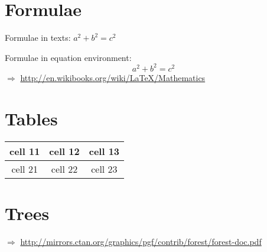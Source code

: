 \section{Formulae}

Formulae in texts: $a^2 + b^2 = c^2$

\noindent Formulae in equation environment:
\begin{equation}
a^2 + b^2 = c^2
\end{equation}
$\Rightarrow$ \url{http://en.wikibooks.org/wiki/LaTeX/Mathematics}

\section{Tables}

\begin{tabular}{c|c|c}
\hline
cell 11 & cell 12 & cell 13 \\
\hline
cell 21 & cell 22 & cell 23 \\
\hline
\end{tabular}

\section{Trees}




\noindent $\Rightarrow$ \url{http://mirrors.ctan.org/graphics/pgf/contrib/forest/forest-doc.pdf}
